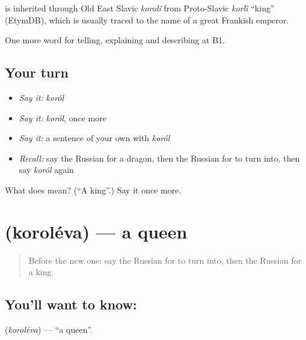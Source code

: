 \begin{cousinweb}
\emph{} is inherited through Old East Slavic \emph{korolĭ} from Proto-Slavic \emph{korľĭ} \textquotedblleft{}king\textquotedblright{} (EtymDB), which is usually traced to the name of a great Frankish emperor.
\end{cousinweb}

\begin{grammarlens}[title={What you've built}]
One more word for telling, explaining and describing at B1.
\end{grammarlens}

\subsection*{Your turn}
\begin{itemize}
\raggedright
  \item \emph{Say it:} \emph{koról}
  \item \emph{Say it:} \emph{koról}, once more
  \item \emph{Say it:} a sentence of your own with \emph{koról}
  \item \emph{Recall:} say the Russian for a dragon, then the Russian for to turn into, then say \emph{koról} again
\end{itemize}

\begin{tcolorbox}[breakable,colback=teal!4,colframe=teal!35!black,title={Before you move on}]
What does  mean? (\textquotedblleft{}A king\textquotedblright{}.) Say it once more.
\end{tcolorbox}
\section[\texorpdfstring{\ru{королева} (koroléva)}{королева (koroléva)}]{ (koroléva) — a queen}

\label{lesson:RU-C321-koroleva}



\begin{quote}
Before the new one: say the Russian for to turn into, then the Russian for a king.
\end{quote}

\subsection*{You'll want to know: }
\textbf{} (\emph{koroléva}) — \textquotedblleft{}a queen\textquotedblright{}.

